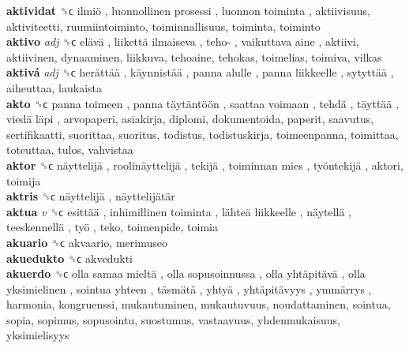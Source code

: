 \textbf{aktividat} ␝ϲ   ilmiö ,  luonnollinen prosessi ,  luonnon toiminta , aktiivisuus, aktiviteetti, ruumiintoiminto, toiminnallisuus, toiminta, toiminto  \\
\textbf{aktivo} \emph{adj}  ␝ϲ   elävä ,  liikettä ilmaiseva ,  teho- ,  vaikuttava aine , aktiivi, aktiivinen, dynaaminen, liikkuva, tehoaine, tehokas, toimelias, toimiva, vilkas  \\
\textbf{aktivá} \emph{adj}  ␝ϲ   herättää ,  käynnistää ,  panna alulle ,  panna liikkeelle ,  sytyttää , aiheuttaa, laukaista  \\
\textbf{akto} ␝ϲ   panna toimeen ,  panna täytäntöön ,  saattaa voimaan ,  tehdä ,  täyttää ,  viedä läpi , arvopaperi, asiakirja, diplomi, dokumentoida, paperit, saavutus, sertifikaatti, suorittaa, suoritus, todistus, todistuskirja, toimeenpanna, toimittaa, toteuttaa, tulos, vahvistaa  \\
\textbf{aktor} ␝ϲ   näyttelijä ,  roolinäyttelijä ,  tekijä ,  toiminnan mies ,  työntekijä , aktori, toimija  \\
\textbf{aktris} ␝ϲ   näyttelijä ,  näyttelijätär   \\
\textbf{aktua} \emph{v}  ␝ϲ   esittää ,  inhimillinen toiminta ,  lähteä liikkeelle ,  näytellä ,  teeskennellä ,  työ , teko, toimenpide, toimia  \\
\textbf{akuario} ␝ϲ  akvaario, merimuseo  \\
\textbf{akuedukto} ␝ϲ  akvedukti  \\
\textbf{akuerdo} ␝ϲ   olla samaa mieltä ,  olla sopusoinnussa ,  olla yhtäpitävä ,  olla yksimielinen ,  sointua yhteen ,  täsmätä ,  yhtyä ,  yhtäpitävyys ,  ymmärrys , harmonia, kongruenssi, mukautuminen, mukautuvuus, noudattaminen, sointua, sopia, sopimus, sopusointu, suostumus, vastaavuus, yhdenmukaisuus, yksimielisyys  \\
